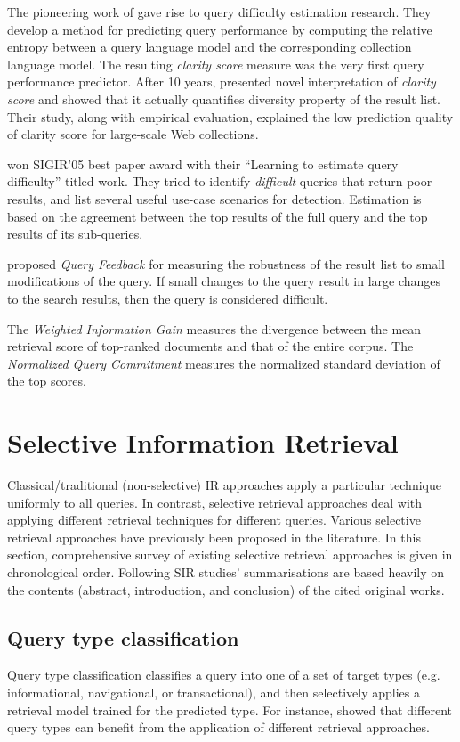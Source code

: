 The pioneering work of \citet*{clarity} gave rise to query difficulty estimation research. They develop a method for predicting query performance by computing the relative entropy between a query language model and the corresponding collection language model. The resulting \emph{clarity score} measure was the very first query performance predictor. After 10 years, \citet*{clarityRe} presented novel interpretation of \emph{clarity score} and showed that it actually quantifies diversity property of the result list. Their study, along with empirical evaluation, explained the low prediction quality of clarity score for large-scale Web collections.

\citet*{Yom05} won SIGIR'05 best paper award with their ``Learning to estimate query difficulty'' titled work. They tried to identify \emph{difficult} queries that return poor results, and list several useful use-case scenarios for detection. Estimation is based on the agreement between the top results of the full query and the top results of its sub-queries.  

\citet*{qf} proposed \emph{Query Feedback} for measuring the robustness of the result list to small modifications of the query.
If small changes to the query result in large changes to the search results, then the query is considered difficult.

The \emph{Weighted Information Gain} \citep{qf} measures the divergence between the mean retrieval score of top-ranked documents and that of the entire corpus. 
The \emph{Normalized Query Commitment} \citep{nqc} measures the normalized standard deviation of the top scores.

\section{Selective Information Retrieval}
Classical/traditional (non-selective) IR approaches apply a particular technique uniformly to all queries. 
In contrast, selective retrieval approaches deal with applying different retrieval techniques for different queries. 
Various selective retrieval approaches have previously been proposed in the literature. 
In this section, comprehensive survey of existing selective retrieval approaches is given in chronological order.
Following SIR studies' summarisations are based heavily on the contents (abstract, introduction, and conclusion) of the cited original works.

\subsection{Query type classification}
Query type classification classifies a query into one of a set of target types (e.g. informational, navigational, or transactional), and then selectively applies a retrieval model trained for the predicted type. For instance, \citet*{QueryTypeClassification} showed that different query types can benefit from the application of different retrieval approaches.

